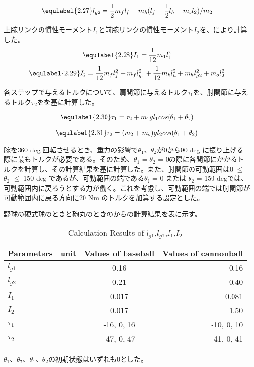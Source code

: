 \begin{eqnarray}
  \equlabel{2.27}
  l_{g2}=\frac{1}{2}m_{f}l_{f}+m_{h}(l_{f}+\frac{1}{2}l_{h}+m_{o}l_{2})/m_{2}
\end{eqnarray}

上腕リンクの慣性モーメント$I_{1}$と前腕リンクの慣性モーメント$I_{2}$を、により計算した。
\begin{eqnarray}
  \equlabel{2.28}
  I_{1}=\frac{1}{12}m_{1}l_{1}^{2}
\end{eqnarray}
\begin{eqnarray}
  \equlabel{2.29}
  I_{2}=\frac{1}{12}m_{f}l_{f}^{2}+m_{f}l_{g1}^{2}+\frac{1}{12}m_{h}l_{h}^{2}+m_{h}l_{g2}^{2}+m_{o}l_{2}^{2}
\end{eqnarray}

各ステップで与えるトルクについて、肩関節に与えるトルク$\tau_{1}$を、肘関節に与えるトルク$\tau_{2}$をを基に計算した。

\begin{eqnarray}
  \equlabel{2.30}
  \tau_{1} = \tau_{2} + m_{1}gl_{1}cos(\theta_{1} + \theta_{2})
\end{eqnarray}

\begin{eqnarray}
  \equlabel{2.31}
  \tau_{2} = (m_{2} + m_{o})gl_{2}cos(\theta_{1} + \theta_{2})
\end{eqnarray}

腕を360 deg 回転させるとき、重力の影響で$\theta_{1}$、$\theta_{2}$が0から90 deg に振り上げる際に最もトルクが必要である。そのため、$\theta_{1}$ = $\theta_{2}$ = 0の際に各関節にかかるトルクを計算し、その計算結果を基に計算した。また、肘関節の可動範囲は0 $\le$ $\theta_{2}$ $\le$ 150 deg であるが、可動範囲の端である$\theta_{2}$ = 0 または $\theta_{2}$ = 150 degでは、可動範囲内に戻ろうとする力が働く。これを考慮し、可動範囲の端では肘関節が可動範囲内に戻る方向に20 Nm のトルクを加算する設定とした。

野球の硬式球のときと砲丸のときのからの計算結果を表に示す。
\begin{table}[tb]
  \begin{center}
    \caption{Calculation Results of $l_{g1}$,$l_{g2}$,$I_{1}$,$I_{2}$}
    \begin{tabular}{l|c|c|r}
      \hline
      Parameters & unit & Values of baseball & Values of cannonball \\
      \hline
      $l_{g1}$ & & 0.16 & 0.16 \\
      $l_{g2}$ & & 0.21 & 0.40 \\
      $I_{1}$ & & 0.017 & 0.081 \\
      $I_{2}$ & & 0.017 & 1.50 \\
      $\tau_{1}$ & & -16, 0, 16 & -10, 0, 10 \\
      $\tau_{2}$ & & -47, 0, 47 & -41, 0, 41 \\
      \hline
    \end{tabular}
  \end{center}
\end{table}
$\theta_{1}$、$\theta_{2}$、$\dot{\theta}_{1}$、$\dot{\theta}_{2}$の初期状態はいずれも0とした。\\


